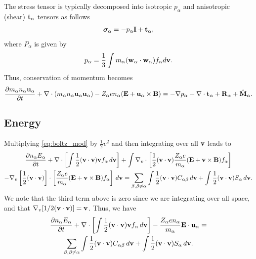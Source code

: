 \documentclass[a4paper,11pt]{report}
\begin{document}
The stress tensor is typically decomposed into isotropic $p_\alpha$ and anisotropic (shear) $\mathbf{t}_\alpha$ tensors as follows
\begin{equation}
\boldsymbol{\sigma}_\alpha = - p_\alpha \mathbf{I} + \mathbf{t}_\alpha,
\end{equation}
where $P_\alpha$ is given by
\begin{equation}
p_\alpha = \frac{1}{3} \int m_\alpha (\mathbf{w}_\alpha \cdot \mathbf{w}_\alpha) f_\alpha d\mathbf{v}.
\end{equation}
Thus, conservation of momentum becomes
\begin{equation}
\label{eq:mom_derv_6}
\frac{\partial m_\alpha n_\alpha \mathbf{u}_\alpha}{\partial t} + \nabla \cdot \left ( m_\alpha n_\alpha \mathbf{u}_\alpha \mathbf{u}_\alpha \right) - Z_\alpha e n_\alpha ( \mathbf{E} + \mathbf{u}_\alpha \times \mathbf{B} ) = - \nabla p_\alpha + \nabla \cdot \mathbf{t}_\alpha + \mathbf{R}_\alpha + \hat{\mathbf{M}}_\alpha.
\end{equation}

\subsection{Energy}
Multiplying \cref{eq:boltz_mod} by $\frac{1}{2} v^2$ and then integrating over all $\mathbf{v}$ leads to
\begin{multline}
\label{eq:energy_derv_1}
\frac{\partial n_\alpha E_\alpha}{\partial t} + \nabla \cdot \left [ \int \frac{1}{2} (\mathbf{v} \cdot \mathbf{v}) \mathbf{v} f_\alpha \, d\mathbf{v} \right ] + \int \nabla_v \cdot \left [ \frac{1}{2} (\mathbf{v} \cdot \mathbf{v}) \frac{Z_\alpha e}{m_\alpha} ( \mathbf{E} + \mathbf{v} \times \mathbf{B} ) f_\alpha \right ] \\
- \nabla_v \left [ \frac{1}{2} (\mathbf{v} \cdot \mathbf{v}) \right ] \cdot \left [ \frac{Z_\alpha e}{m_\alpha} ( \mathbf{E} + \mathbf{v} \times \mathbf{B} ) f_\alpha \right ] \, d\mathbf{v} = \sum_{\beta, \beta \ne \alpha} \int \frac{1}{2} (\mathbf{v} \cdot \mathbf{v}) C_{\alpha \beta} \, d\mathbf{v} + \int \frac{1}{2} (\mathbf{v} \cdot \mathbf{v}) S_\alpha \, d\mathbf{v}.
\end{multline}
We note that the third term above is zero since we are integrating over all space, and that $\nabla_v [ 1/2 (\mathbf{v} \cdot \mathbf{v} ) ] = \mathbf{v}$. Thus, we have
\begin{multline}
\label{eq:energy_derv_2}
\frac{\partial n_\alpha E_\alpha}{\partial t} + \nabla \cdot \left [ \int \frac{1}{2} (\mathbf{v} \cdot \mathbf{v}) \mathbf{v} f_\alpha \, d\mathbf{v} \right ] - \frac{Z_\alpha e n_\alpha}{m_\alpha} \mathbf{E} \cdot \mathbf{u}_\alpha =\\
\sum_{\beta, \beta \ne \alpha} \int \frac{1}{2} (\mathbf{v} \cdot \mathbf{v}) C_{\alpha \beta} \, d\mathbf{v} + \int \frac{1}{2} (\mathbf{v} \cdot \mathbf{v}) S_\alpha \, d\mathbf{v}.
\end{multline}
\end{document}
